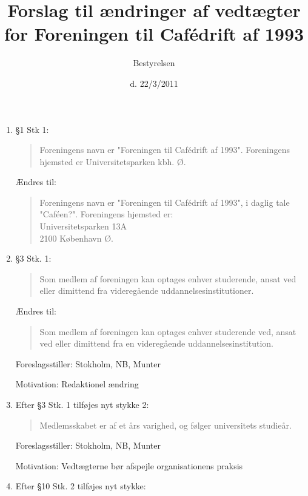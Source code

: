 \documentclass[a4paper,12pt,danish]{article}
\title{Forslag til ændringer af vedtægter for Foreningen til Cafédrift af 1993}
\author{Bestyrelsen}
\date{d. 22/3/2011}
\begin{document}
\maketitle

\begin{enumerate}

\item \S1 Stk 1:
\begin{quote}
Foreningens navn er "Foreningen til Cafédrift af 1993". Foreningens hjemsted er Universitetsparken kbh. Ø.
\end{quote}

Ændres til:

\begin{quote}
Foreningens navn er "Foreningen til Cafédrift af 1993", i daglig tale "Caféen?".
Foreningens hjemsted er:\\
Universitetsparken 13A\\
2100 København Ø.
\end{quote}

\item \S3 Stk. 1:

    \begin{quote}
        Som medlem af foreningen kan optages enhver studerende, ansat ved eller dimittend fra videregående uddannelsesinstitutioner.
    \end{quote}

    Ændres til:

    \begin{quote}
       Som medlem af foreningen kan optages enhver studerende ved, ansat ved eller dimittend fra en videregående uddannelsesinstitution.
    \end{quote}

    Foreslagsstiller: Stokholm, NB, Munter

    Motivation: Redaktionel ændring

\item Efter \S3 Stk. 1 tilføjes nyt stykke 2:

    \begin{quote}
Medlemsskabet er af et års varighed, og følger universitets studieår.
    \end{quote}

    Foreslagsstiller: Stokholm, NB, Munter

    Motivation: Vedtægterne bør afspejle organisationens praksis


\item Efter \S10 Stk. 2 tilføjes nyt stykke:


\end{enumerate}
\end{document}
